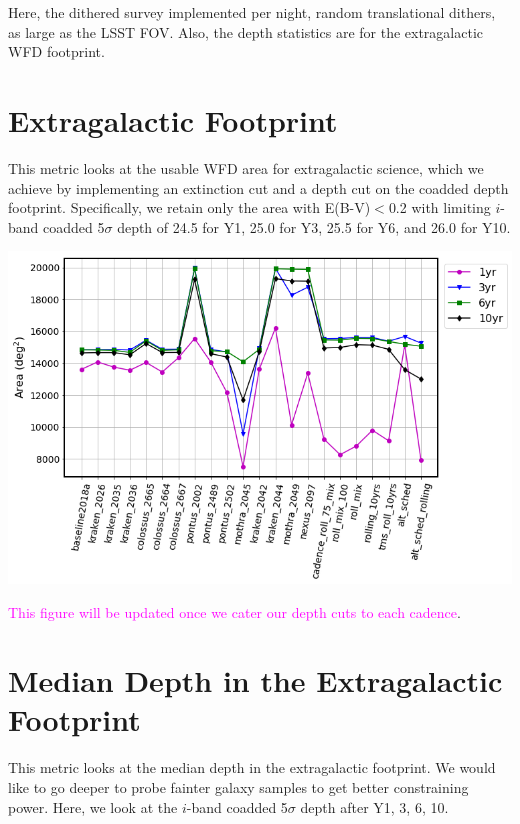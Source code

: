 \documentclass[a4paper,10pt]{article}
\newcommand{\cl}[1]{\textcolor{magenta}{#1}}
\begin{document}
Here, the dithered survey implemented per night, random translational dithers, as large as the LSST FOV. Also, the depth statistics are for the extragalactic WFD footprint.

\newpage
\section*{Extragalactic Footprint\label{area}}
This metric looks at the usable WFD area for extragalactic science, which we achieve by implementing an extinction cut and a depth cut on the coadded depth footprint.  Specifically, we retain only the area with E(B-V)$<$0.2 with limiting $i$-band coadded 5$\sigma$ depth of 24.5 for Y1, 25.0 for Y3, 25.5 for Y6, and 26.0 for Y10.

\begin{minipage}{\columnwidth}
\vspace*{2em}
\centering
 \includegraphics[width=.75\columnwidth]{lss_compare_area_22dbs.png}
\vspace*{2em}
\end{minipage}

\cl{This figure will be updated once we cater our depth cuts to each cadence}.

\newpage
\section*{Median Depth in the Extragalactic Footprint\label{median depth}}
This metric looks at the median depth in the extragalactic footprint. We would like to go deeper to probe fainter galaxy samples to get better constraining power. Here, we look at the $i$-band coadded 5$\sigma$ depth after Y1, 3, 6, 10.
\end{document}
